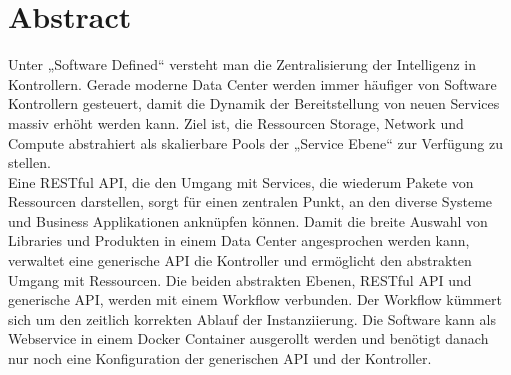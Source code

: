 \chapter*{Abstract}

Unter „Software Defined“ versteht man die Zentralisierung der Intelligenz in Kontrollern. Gerade moderne Data Center werden immer häufiger von Software Kontrollern gesteuert, damit die Dynamik der Bereitstellung von neuen Services massiv erhöht werden kann. Ziel ist, die Ressourcen Storage, Network und Compute abstrahiert als skalierbare Pools der „Service Ebene“ zur Verfügung zu stellen.\\
Eine RESTful API, die den Umgang mit Services, die wiederum Pakete von Ressourcen darstellen, sorgt für einen zentralen Punkt, an den diverse Systeme und Business Applikationen anknüpfen können. Damit die breite Auswahl von Libraries und Produkten in einem Data Center angesprochen werden kann, verwaltet eine generische API die Kontroller und ermöglicht den abstrakten Umgang mit Ressourcen. Die beiden abstrakten Ebenen, RESTful API und generische API, werden mit einem \gls{Workflow} verbunden. Der \gls{Workflow} kümmert sich um den zeitlich korrekten Ablauf der Instanziierung. Die Software kann als Webservice in einem Docker Container ausgerollt werden und benötigt danach nur noch eine Konfiguration der generischen API und der Kontroller.